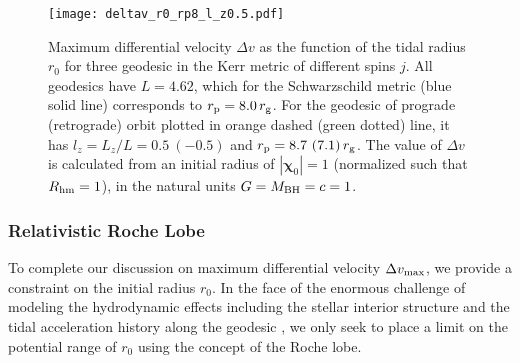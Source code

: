 \documentclass[useAMS,usenatbib]{mn2e}
\def\mBH{M_{\rm BH}}
\def\rg{r_{\rm g}}
\def\rp{r_{\rm p}}
\def\Rhm{R_{\rm hm}}
\newcommand{\abs}[1]{\left|#1\right|}
\begin{document}
\begin{figure}
    \centering
    \texttt{[image: deltav\_r0\_rp8\_l\_z0.5.pdf]}
    \caption{
    Maximum differential velocity $\Delta v$ as the function of the tidal radius $r_0$ for three geodesic in the Kerr metric of different spins $j$.
    All geodesics have $L=4.62$, which for the Schwarzschild metric (blue solid line) corresponds to $\rp=8.0\,\rg$.
    For the geodesic of prograde (retrograde) orbit plotted in orange dashed (green dotted) line, it has $l_z=L_z/L=0.5\ (-0.5)$ and $\rp=8.7\ (7.1)\,\rg$.
    The value of $\Delta v$ is calculated from an initial radius of $\abs{\boldsymbol{\chi}_0}=1$ (normalized such that $\Rhm=1$), in the natural units $G=\mBH=c=1$.
    }
    \label{fig:deltav_r0}
\end{figure}

\subsubsection{Relativistic Roche Lobe}

To complete our discussion on maximum differential velocity $\Delta v_{\rm max}$, we provide a constraint on the initial radius $r_0$. In the face of the enormous challenge of modeling the hydrodynamic effects including the stellar interior structure and the tidal acceleration history along the geodesic \citep[see][for a review]{Rossi2021}, we only seek to place a limit on the potential range of $r_0$ using the concept of the Roche lobe.
\end{document}
